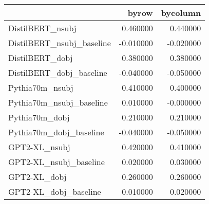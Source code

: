 \begin{tabular}{lrr}
\toprule
 & byrow & bycolumn \\
\midrule
DistilBERT_nsubj & 0.460000 & 0.440000 \\
DistilBERT_nsubj_baseline & -0.010000 & -0.020000 \\
DistilBERT_dobj & 0.380000 & 0.380000 \\
DistilBERT_dobj_baseline & -0.040000 & -0.050000 \\
Pythia70m_nsubj & 0.410000 & 0.400000 \\
Pythia70m_nsubj_baseline & 0.010000 & -0.000000 \\
Pythia70m_dobj & 0.210000 & 0.210000 \\
Pythia70m_dobj_baseline & -0.040000 & -0.050000 \\
GPT2-XL_nsubj & 0.420000 & 0.410000 \\
GPT2-XL_nsubj_baseline & 0.020000 & 0.030000 \\
GPT2-XL_dobj & 0.260000 & 0.260000 \\
GPT2-XL_dobj_baseline & 0.010000 & 0.020000 \\
\bottomrule
\end{tabular}
